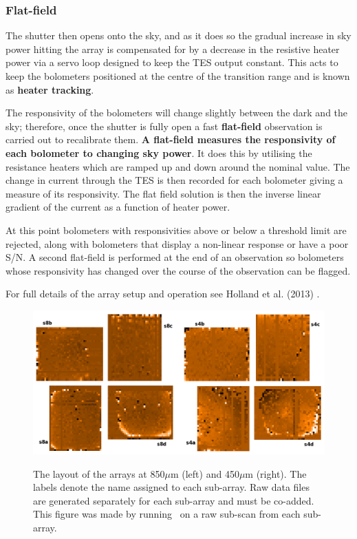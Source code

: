 \subsubsection*{Flat-field}

 The shutter then opens onto the sky, and
as it does so the gradual increase in sky power hitting the array is
compensated for by a decrease in the resistive heater power via a
servo loop designed to keep the TES output constant. This acts to keep
the bolometers positioned at the centre of the transition range and is
known as \textbf{heater tracking}.

The responsivity of the bolometers will change slightly between the
dark and the sky; therefore, once the shutter is fully open a fast
\textbf{flat-field} observation is carried out to recalibrate them.
\textbf{A flat-field measures the responsivity of each bolometer to
changing sky power}. It does this by utilising the resistance heaters
which are ramped up and down around the nominal value. The change in
current through the TES is then recorded for each bolometer giving a
measure of its responsivity. The flat field solution is then the
inverse linear gradient of the current as a function of heater power.

At this point bolometers with responsivities above or below a
threshold limit are rejected, along with bolometers that display a
non-linear response or have a poor S/N. A second flat-field is
performed at the end of an observation so bolometers whose
responsivity has changed over the course of the observation can be
flagged.

For full details of the array setup and operation see Holland et al.
(2013) \cite{s2main}.

\begin{figure}[t!]
\begin{center}
\includegraphics[width=0.8\linewidth]{sc21_arrays}
\label{fig:arrays}
\caption[The physical layout of the arrays at each wavelength]{
  \small The layout of the arrays at 850$\mu$m (left) and
  450$\mu$m (right). The labels denote the name assigned to each
  sub-array. Raw data files are generated separately for each sub-array
  and must be co-added. This figure was made by running
 \wcsmosaic\ on a raw sub-scan from each sub-array.
}
\end{center}
\end{figure}

